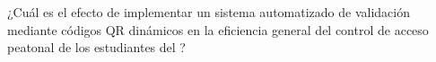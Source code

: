 ¿Cuál es el efecto de implementar un sistema automatizado de
validación mediante códigos QR dinámicos en la eficiencia general del control
de acceso peatonal de los estudiantes del \tescha{}?
